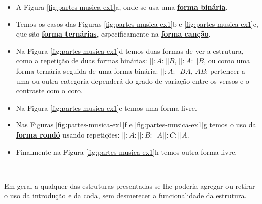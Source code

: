 \begin{itemize}
\item A Figura \ref{fig:partes-musica-ex1}a,
onde se usa uma \hyperref[subsec:formabinaria]{\textbf{forma binária}}.
\item Temos os casos das Figuras \ref{fig:partes-musica-ex1}b e \ref{fig:partes-musica-ex1}c,
que são \hyperref[pp. subsec:formaternaria]{\textbf{forma ternárias}}, 
especificamente na \hyperref[subsec:formacancao]{\textbf{forma canção}}. 
\item Na Figura \ref{fig:partes-musica-ex1}d temos duas formas de ver a estrutura,
como a repetição de duas formas binárias: $||:A:||B$, $||:A:||B$, 
ou como uma forma ternária seguida de uma forma binária: $||:A:||BA$, $AB$;
pertencer a uma ou outra categoria dependerá do grado de variação entre os versos e o contraste com o coro.
\item Na Figura \ref{fig:partes-musica-ex1}e temos uma forma livre.
\item Nas Figuras \ref{fig:partes-musica-ex1}f e  \ref{fig:partes-musica-ex1}g temos o uso 
da \hyperref[subsec:formarondo]{\textbf{forma rondó}} usando repetições: $||:A:||:B:||A||:C:||A$.
\item Finalmente na Figura \ref{fig:partes-musica-ex1}h temos outra forma livre.
\end{itemize}~

Em geral a qualquer das estruturas presentadas se lhe poderia agregar ou retirar o uso da introdução e da coda,
sem desmerecer a funcionalidade da estrutura.
% 




